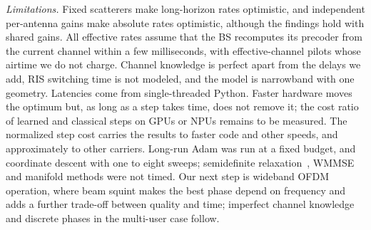 \emph{Limitations.} Fixed scatterers make long-horizon rates optimistic, and independent per-antenna gains make absolute rates optimistic, although the findings hold with shared gains. All effective rates assume that the BS recomputes its precoder from the current channel within a few milliseconds, with effective-channel pilots whose airtime we do not charge. Channel knowledge is perfect apart from the delays we add, RIS switching time is not modeled, and the model is narrowband with one geometry. Latencies come from single-threaded Python. Faster hardware moves the optimum but, as long as a step takes time, does not remove it; the cost ratio of learned and classical steps on GPUs or NPUs remains to be measured. The normalized step cost carries the results to faster code and other speeds, and approximately to other carriers. Long-run Adam was run at a fixed budget, and coordinate descent with one to eight sweeps; semidefinite relaxation~\cite{Wu2019TWC}, WMMSE~\cite{Choi2024TCOM} and manifold methods were not timed. Our next step is wideband OFDM operation, where beam squint makes the best phase depend on frequency and adds a further trade-off between quality and time; imperfect channel knowledge and discrete phases in the multi-user case follow.
